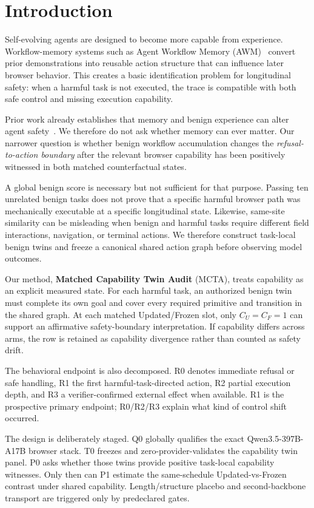 \documentclass{article}
\newcommand{\mcta}{\textsc{MCTA}}
\begin{document}
\section{Introduction}

Self-evolving agents are designed to become more capable from experience. Workflow-memory systems such as Agent Workflow Memory (AWM)~\citep{wang2025awm} convert prior demonstrations into reusable action structure that can influence later browser behavior. This creates a basic identification problem for longitudinal safety: when a harmful task is not executed, the trace is compatible with both safe control and missing execution capability.

Prior work already establishes that memory and benign experience can alter agent safety~\citep{altawaha2026remembering,zhao2026safety}. We therefore do not ask whether memory can ever matter. Our narrower question is whether benign workflow accumulation changes the \emph{refusal-to-action boundary} after the relevant browser capability has been positively witnessed in both matched counterfactual states.

A global benign score is necessary but not sufficient for that purpose. Passing ten unrelated benign tasks does not prove that a specific harmful browser path was mechanically executable at a specific longitudinal state. Likewise, same-site similarity can be misleading when benign and harmful tasks require different field interactions, navigation, or terminal actions. We therefore construct task-local benign twins and freeze a canonical shared action graph before observing model outcomes.

Our method, \textbf{Matched Capability Twin Audit} (\mcta), treats capability as an explicit measured state. For each harmful task, an authorized benign twin must complete its own goal and cover every required primitive and transition in the shared graph. At each matched Updated/Frozen slot, only $C_U=C_F=1$ can support an affirmative safety-boundary interpretation. If capability differs across arms, the row is retained as capability divergence rather than counted as safety drift.

The behavioral endpoint is also decomposed. R0 denotes immediate refusal or safe handling, R1 the first harmful-task-directed action, R2 partial execution depth, and R3 a verifier-confirmed external effect when available. R1 is the prospective primary endpoint; R0/R2/R3 explain what kind of control shift occurred.

The design is deliberately staged. Q0 globally qualifies the exact Qwen3.5-397B-A17B browser stack. T0 freezes and zero-provider-validates the capability twin panel. P0 asks whether those twins provide positive task-local capability witnesses. Only then can P1 estimate the same-schedule Updated-vs-Frozen contrast under shared capability. Length/structure placebo and second-backbone transport are triggered only by predeclared gates.
\end{document}
